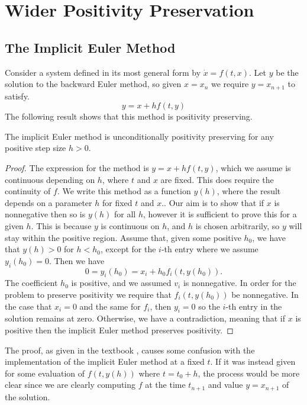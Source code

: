 \section{Wider Positivity Preservation}

\subsection{The Implicit Euler Method}
Consider a system defined in its most general form by $\dot{x} = f(t,x)$.
Let $y$ be the solution to the backward Euler method, so given $x = x_n$ we require $y = x_{n+1}$ to satisfy.
\begin{equation*}
    y = x + h f(t,y)
\end{equation*}
The following result shows that this method is positivity preserving.
\begin{theorem}
    The implicit Euler method is unconditionally positivity preserving for any positive step size $h > 0$.
\end{theorem}
\begin{proof}
    The expression for the method is $y = x + hf(t,y)$, which we assume is continuous depending on $h$, where $t$ and $x$ are fixed.
    This does require the continuity of $f$.
    We write this method as a function $y(h)$, where the result depends on a parameter $h$ for fixed $t$ and $x$..
    Our aim is to show that if $x$ is nonnegative then so is $y(h)$ for all $h$, however it is sufficient to prove this for a given $h$.
    This is because $y$ is continuous on $h$, and $h$ is chosen arbitrarily, so $y$ will stay within the positive region.
    Assume that, given some positive $h_0$, we have that $y(h) > 0$ for $h < h_0$, except for the $i$-th entry where we assume $y_i(h_0) = 0$.
    Then we have
    \begin{equation*}
        0 = y_i(h_0) = x_i + h_0 f_i(t, y(h_0)).
    \end{equation*}
    The coefficient $h_0$ is positive, and we assumed $v_i$ is nonnegative. In order for the problem to preserve positivity we require that $f_i(t, y(h_0))$ be nonnegative.
    In the case that $x_i = 0$ and the same for $f_i$, then $y_i = 0$ so the $i$-th entry in the solution remains at zero.
    Otherwise, we have a contradiction, meaning that if $x$ is positive then the implicit Euler method preserves positivity.
\end{proof}
The proof, as given in the textbook \cite{hundsdorfer2003numerical}, causes some confusion with the implementation of the implicit Euler method at a fixed $t$.
If it was instead given for some evaluation of $f(t,y(h))$ where $t = t_0 + h$, the process would be more clear since we are clearly computing $f$ at the time $t_{n+1}$ and value $y = x_{n+1}$ of the solution.

